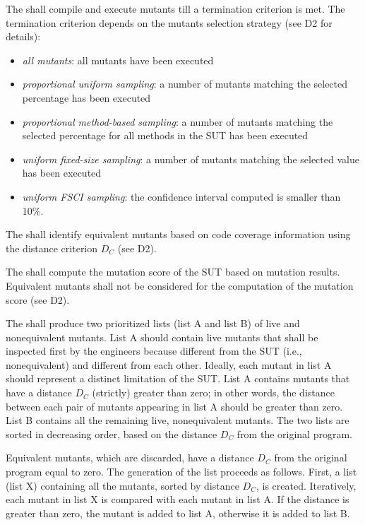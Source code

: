 
\RQ{} The \FAQAS shall compile and execute mutants till a termination criterion is met. The termination criterion depends on the mutants selection strategy (see D2 for details):
\begin{itemize}
	\item \emph{all mutants}: all mutants have been executed
	\item \emph{proportional uniform sampling}: a number of mutants matching the selected percentage has been executed
	\item \emph{proportional method-based sampling}: a number of mutants matching the selected percentage for all methods in the SUT has been executed
	\item \emph{uniform fixed-size sampling}: a number of mutants matching the selected value has been executed
	\item \emph{uniform FSCI sampling}: the confidence interval computed is smaller than 10\%.
\end{itemize}


\RQ{} The \FAQAS shall identify equivalent mutants based on code coverage information using the distance criterion $D_C$ (see D2).


\RQ{} The \FAQAS shall compute the mutation score of the SUT based on mutation results. Equivalent mutants shall not be considered for the computation of the mutation score (see D2).

\RQ{} The \FAQAS shall produce two prioritized lists (list A and list B) of live and nonequivalent mutants.
List A should contain live mutants that shall be inspected first by the engineers because different from the SUT (i.e., nonequivalent) and different from each other. Ideally, each mutant in list A should represent a distinct limitation of the SUT.
List A contains mutants that have a distance $D_C$ (strictly) greater than zero; in other words, the distance between each pair of mutants appearing in list A should be greater than zero.
List B contains all the remaining live, nonequivalent mutants.
The two lists are sorted in decreasing order, based on the distance $D_C$ from the original program.

\remark Equivalent mutants, which are discarded, have a distance $D_C$ from the original program equal to zero.
The generation of the list proceeds as follows. First, a list (list X) containing all the mutants, sorted by distance $D_C$, is created. Iteratively, each mutant in list X is compared with each mutant in list A. If the distance is greater than zero, the mutant is added to list A, otherwise it is added to list B.


